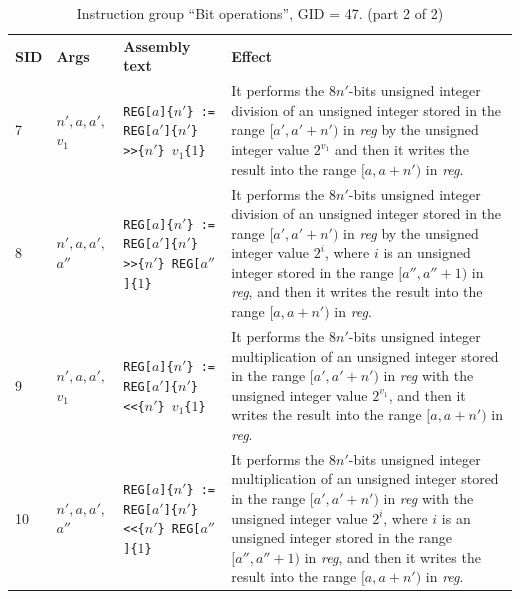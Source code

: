 \documentclass[10pt,twocolumn]{article}
\begin{document}
\begin{table}[!h]
\begin{center}
\def\arraystretch{1.5}
\begin{tabular}{lp{1.2cm}p{5.5cm}p{7.5cm}}
\textbf{SID} & \textbf{Args} & \textbf{Assembly text} & \textbf{Effect}
\\
\vspace{-0.05cm}

7 & $ n',a,a',$ \newline $ v_{1} $ %
& \texttt{REG[}$ a $\texttt{]\{}$ n' $\texttt{\} := REG[}$ a' $\texttt{]\{}$
n' $\texttt{\} >>\{}$ n' $\texttt{\} }$ v_{1} $\texttt{\{}$ 1 $\texttt{\}}
%
& It performs the $ 8n' $-bits unsigned integer division of an unsigned integer
stored in the range $ [a',a'+n') $ in \textit{reg} by the unsigned integer value
$ 2^{v_1} $ and then it writes the result into the range $ [a,a+n') $ in
\textit{reg}. \\

8 & $ n',a,a',$ \newline $ a'' $ %
& \texttt{REG[}$ a $\texttt{]\{}$ n' $\texttt{\} := REG[}$ a' $\texttt{]\{}$ n'
$\texttt{\} >>\{}$ n' $\texttt{\} REG[}$ a'' $\texttt{]\{}$ 1 $\texttt{\}} %
& It performs the $ 8n' $-bits unsigned integer division of an unsigned integer
stored in the range $ [a',a'+n') $ in \textit{reg} by the unsigned integer value
$ 2^{i} $, where $ i $ is an unsigned integer stored in the range $ [a'',a''+1)
$ in \textit{reg}, and then it writes the result into the range $ [a,a+n') $ in
\textit{reg}. \\

9 & $ n',a,a',$ \newline $ v_{1} $ %
& \texttt{REG[}$ a $\texttt{]\{}$ n' $\texttt{\} := REG[}$ a' $\texttt{]\{}$ n'
$\texttt{\} <<\{}$ n' $\texttt{\} }$ v_{1} $\texttt{\{}$ 1 $\texttt{\}} %
& It performs the $ 8n' $-bits unsigned integer multiplication of an unsigned
integer stored in the range $ [a',a'+n') $ in \textit{reg} with the unsigned
integer value $ 2^{v_1} $, and then it writes the result into the range $
[a,a+n') $ in \textit{reg}. \\

10 & $ n',a,a',$ \newline $ a'' $ %
& \texttt{REG[}$ a $\texttt{]\{}$ n' $\texttt{\} := REG[}$ a' $\texttt{]\{}$ n'
$\texttt{\} <<\{}$ n' $\texttt{\} REG[}$ a'' $\texttt{]\{}$ 1 $\texttt{\}} %
& It performs the $ 8n' $-bits unsigned integer multiplication of an unsigned
integer stored in the range $ [a',a'+n') $ in \textit{reg} with the unsigned
integer value $ 2^{i} $, where $ i $ is an unsigned integer stored in the range
$ [a'',a''+1) $ in \textit{reg}, and then it writes the result into the range $
[a,a+n') $ in \textit{reg}. \\

\end{tabular}
\end{center}
\caption{Instruction group ``Bit operations'', GID = 47. (part 2 of 2)}
\end{table}
\end{document}
